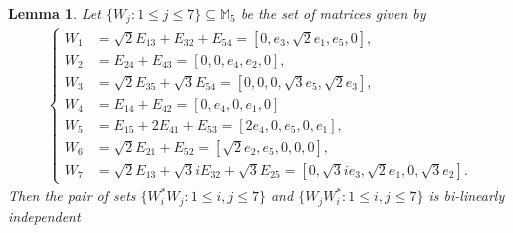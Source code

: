 \documentclass[10pt,reqno]{amsart}
\theoremstyle{definition}
\theoremstyle{plain}
\newtheorem{lem}[defn]{Lemma}
\theoremstyle{remark}
\newcommand{\mbb}[1]{\mathbb{#1}}
\newcommand{\msc}[1]{\mathscr{#1}}
\newcommand{\M}[1]{\mbb{M}_{#1}}%
\numberwithin{equation}{section}%
\begin{document}
 \begin{lem}\label{lem-CR-7-appendix}
	Let $\{W_j:1\leq j\leq 7\}\subseteq\M{5}$ be the set of matrices given by
	\begin{align}\label{eq-CR-7-appendix}
		\begin{cases}
			W_1&=\sqrt{2}E_{13}+E_{32}+E_{54}=[0,e_3,\sqrt{2}e_1,e_5,0],\\
			W_2&=E_{24}+E_{43}=[0,0,e_4,e_2,0],\\
			W_3&=\sqrt{2}E_{35}+\sqrt{3}E_{54}=[0,0,0,\sqrt{3}e_5,\sqrt{2}e_3],\\
			W_4&=E_{14}+E_{42}=[0,e_4,0,e_1,0]\\
			W_5&=E_{15}+2E_{41}+E_{53}=[2e_4,0,e_5,0,e_1],\\
			W_6&=\sqrt{2}E_{21}+E_{52}=[\sqrt{2}e_2,e_5,0,0,0],\\
			W_7&=\sqrt{2}E_{13}+\sqrt{3}iE_{32}+\sqrt{3}E_{25}=[0,\sqrt{3}ie_3,\sqrt{2}e_1,0,\sqrt{3}e_2].
		\end{cases}
	\end{align}
	Then the pair of sets $\{W_i^*W_j:1\leq i,j\leq 7\}$ and $\{W_jW_i^*: 1\leq i,j\leq 7\}$ is bi-linearly independent
\end{lem}
\end{document}
